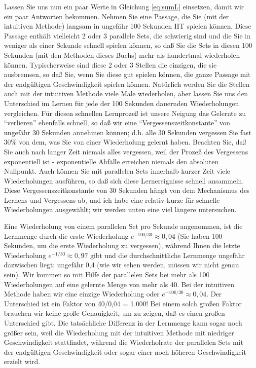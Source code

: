 Lassen Sie uns nun ein paar Werte in Gleichung \ref{eq:sumL} einsetzen, damit wir ein paar Antworten bekommen.
Nehmen Sie eine Passage, die Sie (mit der intuitiven Methode) langsam in ungefähr 100 Sekunden HT spielen können.
Diese Passage enthält vielleicht 2 oder 3 parallele Sets, die schwierig sind und die Sie in weniger als einer Sekunde schnell spielen können, so daß Sie die Sets in diesen 100 Sekunden (mit den Methoden dieses Buchs) mehr als hundertmal wiederholen können.
Typischerweise sind diese 2 oder 3 Stellen die einzigen, die sie ausbremsen, so daß Sie, wenn Sie diese gut spielen können, die ganze Passage mit der endgültigen Geschwindigkeit spielen können.
Natürlich werden Sie die Stellen auch mit der intuitiven Methode viele Male wiederholen, aber lassen Sie uns den Unterschied im Lernen für jede der 100 Sekunden dauernden Wiederholungen vergleichen.
Für diesen schnellen Lernprozeß ist unsere Neigung das Gelernte zu \enquote{verlieren} ebenfalls schnell, so daß wir eine \enquote{Vergessenszeitkonstante} von ungefähr 30 Sekunden annehmen können; d.h. alle 30 Sekunden vergessen Sie fast 30\% von dem, was Sie von einer Wiederholung gelernt haben.
Beachten Sie, daß Sie auch nach langer Zeit niemals alles vergessen, weil der Prozeß des Vergessens exponentiell ist - exponentielle Abfälle erreichen niemals den absoluten Nullpunkt.
Auch können Sie mit parallelen Sets innerhalb kurzer Zeit viele Wiederholungen ausführen, so daß sich diese Lernereignisse schnell ansammeln.
Diese Vergessenszeitkonstante von 30 Sekunden hängt von dem Mechanismus des Lernens und Vergessens ab, und ich habe eine relativ kurze für schnelle Wiederholungen ausgewählt; wir werden unten eine viel längere untersuchen.

Eine Wiederholung von einem parallelen Set pro Sekunde angenommen, ist die Lernmenge durch die erste Wiederholung $e^{-100/30} \approx 0,04$ (Sie haben 100 Sekunden, um die erste Wiederholung zu vergessen), während Ihnen die letzte Wiederholung $e^{-1/30} \approx 0,97$ gibt und die durchschnittliche Lernmenge ungefähr dazwischen liegt: ungefähr 0,4 (wie wir sehen werden, müssen wir nicht genau sein). Wir kommen so mit Hilfe der parallelen Sets bei mehr als 100 Wiederholungen auf eine gelernte Menge von mehr als 40.
Bei der intuitiven Methode haben wir eine einzige Wiederholung oder $e^{-100/30} \approx 0,04$.
Der Unterschied ist ein Faktor von 40/0,04 = 1.000!
Bei einem solch großen Faktor brauchen wir keine große Genauigkeit, um zu zeigen, daß es einen großen Unterschied gibt.
Die tatsächliche Differenz in der Lernmenge kann sogar noch größer sein, weil die Wiederholung mit der intuitiven Methode mit niedriger Geschwindigkeit stattfindet, während die Wiederholrate der parallelen Sets mit der endgültigen Geschwindigkeit oder sogar einer noch höheren Geschwindigkeit erzielt wird.

